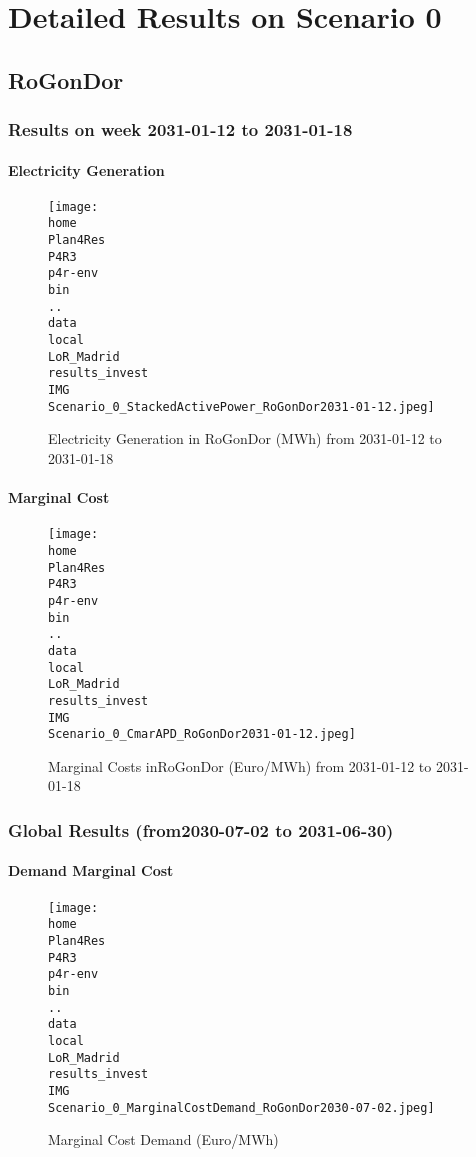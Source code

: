 \documentclass[10pt]{report}
\begin{document}
\chapter{Detailed Results on Scenario 0}
\newpage\section{RoGonDor}
\subsection{Results on week 2031-01-12 to 2031-01-18}
\subsubsection{Electricity Generation}
\begin{figure}[H]
\centering
\texttt{[image: \\home\\Plan4Res\\P4R3\\p4r-env\\bin\\..\\data\\local\\LoR\_Madrid\\results\_invest\\IMG\\Scenario\_0\_StackedActivePower\_RoGonDor2031-01-12.jpeg]}
\caption{Electricity Generation in RoGonDor (MWh) from 2031-01-12 to 2031-01-18}
\label{fig:Scenario_0_StackedActivePower_RoGonDor2031-01-12.jpeg}
\end{figure}
\subsubsection{Marginal Cost}
\begin{figure}[H]
\centering
\texttt{[image: \\home\\Plan4Res\\P4R3\\p4r-env\\bin\\..\\data\\local\\LoR\_Madrid\\results\_invest\\IMG\\Scenario\_0\_CmarAPD\_RoGonDor2031-01-12.jpeg]}
\caption{Marginal Costs inRoGonDor (Euro/MWh) from 2031-01-12 to 2031-01-18}
\label{fig:Scenario_0_CmarAPD_RoGonDor2031-01-12.jpeg}
\end{figure}
\subsection{Global Results (from2030-07-02 to 2031-06-30)}
\subsubsection{Demand Marginal Cost}
\begin{figure}[H]
\centering
\texttt{[image: \\home\\Plan4Res\\P4R3\\p4r-env\\bin\\..\\data\\local\\LoR\_Madrid\\results\_invest\\IMG\\Scenario\_0\_MarginalCostDemand\_RoGonDor2030-07-02.jpeg]}
\caption{Marginal Cost Demand (Euro/MWh)}
\label{fig:Scenario_0_MarginalCostDemand_RoGonDor2030-07-02.jpeg}
\end{figure}
\end{document}
